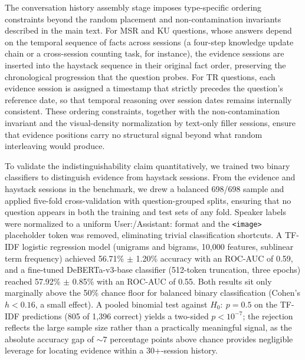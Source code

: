 \documentclass{llmxive}
\begin{document}
The conversation history assembly stage imposes type-specific ordering constraints beyond the random placement and non-contamination invariants described in the main text. For MSR and KU questions, whose answers depend on the temporal sequence of facts across sessions (a four-step knowledge update chain or a cross-session counting task, for instance), the evidence sessions are inserted into the haystack sequence in their original fact order, preserving the chronological progression that the question probes. For TR questions, each evidence session is assigned a timestamp that strictly precedes the question's reference date, so that temporal reasoning over session dates remains internally consistent. These ordering constraints, together with the non-contamination invariant and the visual-density normalization by text-only filler sessions, ensure that evidence positions carry no structural signal beyond what random interleaving would produce.

To validate the indistinguishability claim quantitatively, we trained two binary classifiers to distinguish evidence from haystack sessions. From the evidence and haystack sessions in the benchmark, we drew a balanced 698/698 sample and applied five-fold cross-validation with question-grouped splits, ensuring that no question appears in both the training and test sets of any fold. Speaker labels were normalized to a uniform User:/Assistant: format and the \texttt{<image>} placeholder token was removed, eliminating trivial classification shortcuts. A TF-IDF logistic regression model (unigrams and bigrams, 10{,}000 features, sublinear term frequency) achieved 56.71\% $\pm$ 1.20\% accuracy with an ROC-AUC of 0.59, and a fine-tuned DeBERTa-v3-base classifier (512-token truncation, three epochs) reached 57.92\% $\pm$ 0.85\% with an ROC-AUC of 0.55. Both results sit only marginally above the 50\% chance floor for balanced binary classification (Cohen's $h < 0.16$, a small effect). A pooled binomial test against $H_0{:}~p = 0.5$ on the TF-IDF predictions (805 of 1{,}396 correct) yields a two-sided $p < 10^{-7}$; the rejection reflects the large sample size rather than a practically meaningful signal, as the absolute accuracy gap of ${\sim}7$ percentage points above chance provides negligible leverage for locating evidence within a 30{+}-session history.
\end{document}

